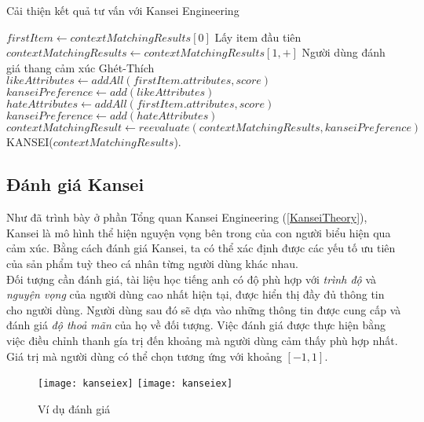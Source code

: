 \begin{algorithm}[H]
\caption{Cải thiện kết quả tư vấn với Kansei Engineering}\label{kansei}
\begin{algorithmic}[1]
\State $firstItem \gets contextMatchingResults[0]$ Lấy item đầu tiên 
\State $contextMatchingResults \gets contextMatchingResults[1,+]$
\State Người dùng đánh giá thang cảm xúc Ghét-Thích
\State $likeAttributes \gets addAll(firstItem.attributes, score)$
\State $kanseiPreference \gets add(likeAttributes)$
\Else
\State $hateAttributes \gets addAll(firstItem.attributes, score)$
\State $kanseiPreference \gets add(hateAttributes)$
\EndIf
\State $contextMatchingResult \gets reevaluate(contextMatchingResults, kanseiPreference)$
\State KANSEI($contextMatchingResults$).
\EndProcedure
\end{algorithmic}
\end{algorithm}


\subsection{Đánh giá Kansei}

Như đã trình bày ở phần Tổng quan Kansei Engineering (\ref{KanseiTheory}), Kansei là mô hình thể hiện nguyện vọng bên trong của con người biểu hiện qua cảm xúc. Bằng cách đánh giá Kansei, ta có thể xác định được các yếu tố ưu tiên của sản phẩm tuỳ theo cá nhân từng người dùng khác nhau.\\

Đối tượng cần đánh giá, tài liệu học tiếng anh có độ phù hợp với \textit{trình độ} và \textit{nguyện vọng} của người dùng cao nhất hiện tại, được hiển thị đầy đủ thông tin cho người dùng. Người dùng sau đó sẽ dựa vào những thông tin được cung cấp và đánh giá \textit{độ thoả mãn} của họ về đối tượng. Việc đánh giá được thực hiện bằng việc điều chỉnh thanh gía trị đến khoảng mà người dùng cảm thấy phù hợp nhất. Giá trị mà người dùng có thể chọn tương ứng với khoảng $[-1, 1 ]$.\\


\begin{figure}[H]
  \begin{center}
    \ifpdf
      \texttt{[image: kanseiex]}
    \else
      \texttt{[image: kanseiex]}
    \fi
    \caption{Ví dụ đánh giá}
    \label{KanseiModelEx}
  \end{center}
\end{figure}

